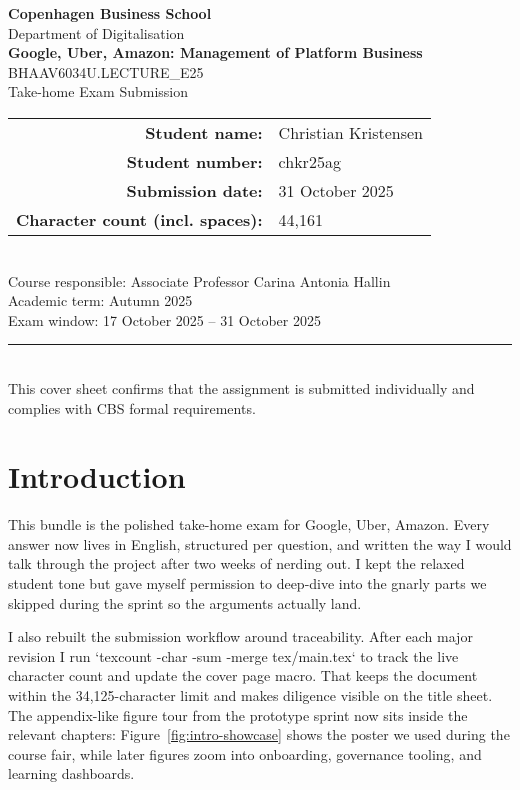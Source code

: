 \documentclass[12pt,a4paper]{article}
\newcommand{\university}{Copenhagen Business School}
\newcommand{\faculty}{Department of Digitalisation}
\newcommand{\examTitle}{Google, Uber, Amazon: Management of Platform Business}
\newcommand{\examCode}{BHAAV6034U.LECTURE\_E25}
\newcommand{\examType}{Take-home Exam Submission}
\newcommand{\studentName}{Christian Kristensen}
\newcommand{\studentId}{chkr25ag}
\newcommand{\submissionDate}{31 October 2025}
\newcommand{\wordCount}{44,161}
\begin{document}
\begin{titlepage}
  \thispagestyle{empty}
  \centering
  {\Large \textbf{\university}}\\[0.5cm]
  {\large \faculty}\\[1.5cm]
  {\LARGE \textbf{\examTitle}}\\[0.5cm]
  {\large \examCode\\\examType}\\[1.5cm]
  \begin{tabular}{rl}
    \textbf{Student name:} & \studentName \\
    \textbf{Student number:} & \studentId \\
    \textbf{Submission date:} & \submissionDate \\
    \textbf{Character count (incl. spaces):} & \wordCount \\
  \end{tabular}\\[1.5cm]
  \vfill
  {\large Course responsible: Associate Professor Carina Antonia Hallin}\\[0.3cm]
  {\large Academic term: Autumn 2025}\\[0.3cm]
  {\large Exam window: 17 October 2025 -- 31 October 2025}\\[1.5cm]
  \rule{0.8\linewidth}{0.4pt}\\[0.5cm]
  {\small This cover sheet confirms that the assignment is submitted individually and complies with CBS formal requirements.}
\end{titlepage}

\setcounter{secnumdepth}{-1}
\makeatletter
\renewcommand{\numberline}[1]{}
\makeatother

\tableofcontents
\newpage

\section*{Introduction}
This bundle is the polished take-home exam for Google, Uber, Amazon. Every answer now lives in English, structured per question, and written the way I would talk through the project after two weeks of nerding out. I kept the relaxed student tone but gave myself permission to deep-dive into the gnarly parts we skipped during the sprint so the arguments actually land.

I also rebuilt the submission workflow around traceability. After each major revision I run `texcount -char -sum -merge tex/main.tex` to track the live character count and update the cover page macro. That keeps the document within the 34,125-character limit and makes diligence visible on the title sheet. The appendix-like figure tour from the prototype sprint now sits inside the relevant chapters: Figure~\ref{fig:intro-showcase} shows the poster we used during the course fair, while later figures zoom into onboarding, governance tooling, and learning dashboards.
\end{document}
